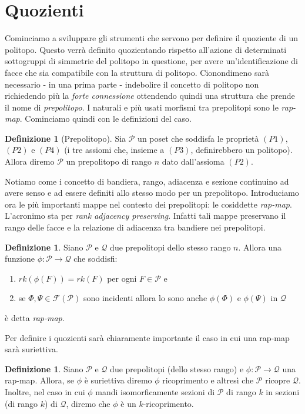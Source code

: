 \documentclass[a4paper,12pt]{report}
\newcommand{\p}{\mathcal{P}}
\theoremstyle{plain}
\theoremstyle{definition}
\newtheorem{defin}[teo]{Definizione}
\newcommand\flag[1]{\mathcal{F}(#1)}
\begin{document}
\section{Quozienti}
Cominciamo a sviluppare gli strumenti che servono per definire il quoziente di un politopo. Questo verr\`a definito quozientando rispetto all'azione di
determinati sottogruppi di simmetrie del politopo in questione, per avere un'identificazione di facce che sia compatibile con la struttura di politopo.
Cionondimeno sar\`a necessario - in una prima parte - indebolire il concetto di politopo non richiedendo pi\`u la \emph{forte connessione} ottendendo
quindi una struttura che prende il nome di \emph{prepolitopo}. I naturali e pi\`u usati morfismi tra prepolitopi sono le \emph{rap-map}. Cominciamo quindi
con le definizioni del caso.
\begin{defin}[Prepolitopo]
Sia $\p$ un poset che soddisfa le propriet\`a $(P1)$, $(P2)$ e $(P4)$ (i tre assiomi che, insieme a $(P3)$, definirebbero un politopo). Allora diremo
$\p$ un prepolitopo di rango $n$ dato dall'assioma $(P2)$.
\end{defin}
Notiamo come i concetto di bandiera, rango, adiacenza e sezione continuino ad avere senso e ad essere definiti allo stesso modo per un prepolitopo.
Introduciamo ora le pi\`u importanti mappe nel contesto dei prepolitopi: le cosiddette \emph{rap-map}. L'acronimo sta per \emph{rank adjacency preserving}.
Infatti tali mappe preservano il rango delle facce e la relazione di adiacenza tra bandiere nei prepolitopi.
\begin{defin}
Siano $\p$ e $\mathcal{Q}$ due prepolitopi dello stesso rango $n$. Allora una funzione $\phi:\p\longrightarrow\mathcal{Q}$ che soddisfi:
\begin{enumerate}
\item $rk(\phi(F))=rk(F)$ per ogni $F\in\p$ e
\item se $\Phi,\Psi\in\flag{\p}$ sono incidenti allora lo sono anche $\phi(\Phi)$ e $\phi(\Psi)$ in $\mathcal{Q}$
\end{enumerate}
\`e detta \emph{rap-map}.
\end{defin}
Per definire i quozienti sar\`a chiaramente importante il caso in cui una rap-map sar\`a suriettiva.
\begin{defin}
Siano $\p$ e $\mathcal{Q}$ due prepolitopi (dello stesso rango) e $\phi:\p\longrightarrow\mathcal{Q}$ una rap-map. Allora, se $\phi$ \`e suriettiva
diremo $\phi$ ricoprimento e altres\`i che $\p$ ricopre $\mathcal{Q}$.\\
Inoltre, nel caso in cui $\phi$ mandi isomorficamente sezioni di $\p$ di rango $k$ in sezioni (di rango $k$) di $\mathcal{Q}$, diremo che
$\phi$ \`e un $k$-ricoprimento.
\end{defin}
\end{document}
